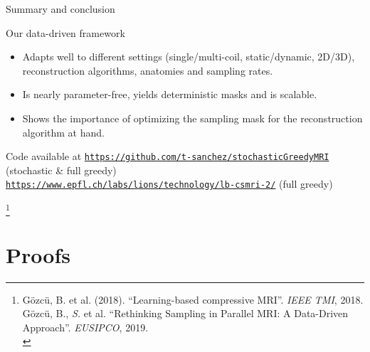 \begin{frame}{Summary and conclusion}
\begin{block}{Our data-driven framework}
\begin{itemize}
\item Adapts well to different settings (single/multi-coil, static/dynamic, 2D/3D), reconstruction algorithms, anatomies and sampling rates. 
\item Is nearly parameter-free, yields deterministic masks and is scalable.
\item Shows the importance of optimizing the sampling mask for the reconstruction algorithm at hand.
\end{itemize}
\end{block}

Code available at \href{https://github.com/t-sanchez/stochasticGreedyMRI}{\texttt{https://github.com/t-sanchez/stochasticGreedyMRI}} (stochastic \& full  greedy)\\ \href{https://www.epfl.ch/labs/lions/technology/lb-csmri-2/}{\texttt{https://www.epfl.ch/labs/lions/technology/lb-csmri-2/}} (full greedy)
	
\let\thefootnote\relax\footnote{\tiny  G\"ozc\"u, B. et al. (2018). ``Learning-based compressive MRI''. \textit{IEEE TMI}, 2018.\\
 G\"ozc\"u, B., \textit{S.} et al. ``Rethinking Sampling in Parallel MRI: A Data-Driven Approach''. \textit{EUSIPCO}, 2019.\\}
\end{frame}



\section{Proofs}



